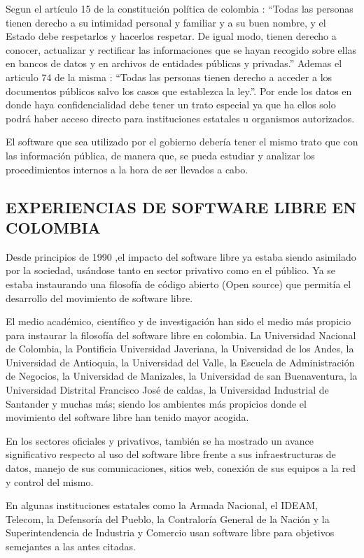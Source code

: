 Segun el artículo 15 de la constitución política de colombia :
“Todas las personas tienen derecho a su intimidad personal y
familiar y a su buen nombre, y el Estado debe respetarlos y
hacerlos respetar. De igual modo, tienen derecho a conocer,
actualizar y rectificar las informaciones que se hayan recogido
sobre ellas en bancos de datos y en archivos de entidades
públicas y privadas.” Ademas el articulo 74 de la misma : “Todas
las personas tienen derecho a acceder a los documentos
públicos salvo los casos que establezca la ley.”. Por ende los
datos en donde haya confidencialidad debe tener un trato
especial ya que ha ellos solo podrá haber acceso directo para
instituciones estatales u organismos autorizados.

El software que sea utilizado por el gobierno debería tener el
mismo trato que con las información pública, de manera que, se
pueda estudiar y analizar los procedimientos internos a la hora
de ser llevados a cabo.

\subsection*{EXPERIENCIAS DE SOFTWARE LIBRE EN COLOMBIA}
 
Desde principios de 1990 ,el impacto del software libre ya
estaba siendo asimilado por la sociedad, usándose tanto en
sector privativo como en el público. Ya se estaba instaurando
una filosofía de código abierto (Open source) que permitía el
desarrollo del movimiento de software libre.

El medio académico, científico y de investigación han sido el
medio más propicio para instaurar la filosofía del software libre
en colombia. La Universidad Nacional de Colombia, la Pontificia
Universidad Javeriana, la Universidad de los Andes, la
Universidad de Antioquia, la Universidad del Valle, la Escuela de
Administración de Negocios, la Universidad de Manizales, la
Universidad de san Buenaventura, la Universidad Distrital
Francisco José de caldas, la Universidad Industrial de Santander
y muchas más; siendo los ambientes más propicios donde el
movimiento del software libre han tenido mayor acogida.

En los sectores oficiales y privativos, también se ha mostrado un
avance significativo respecto al uso del software libre frente a
sus infraestructuras de datos, manejo de sus comunicaciones,
sitios web, conexión de sus equipos a la red y control del mismo.

En algunas instituciones estatales como la Armada Nacional, el
IDEAM, Telecom, la Defensoría del Pueblo, la Contraloría
General de la Nación y la Superintendencia de Industria y
Comercio usan software libre para objetivos semejantes a las
antes citadas.

